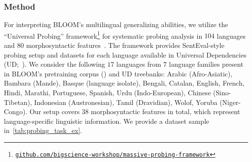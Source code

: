 \documentclass[twoside,11pt]{article}
\begin{document}
\subsubsection{Method}
\label{subsec:eval:probing}
For interpreting BLOOM's multilingual generalizing abilities, we utilize the ``Universal Probing'' framework\footnote{\href{https://github.com/bigscience-workshop/massive-probing-framework}{\texttt{github.com/bigscience-workshop/massive-probing-framework}}} for systematic probing analysis in $104$ languages and $80$ morphosyntactic features~\citep{serikov2022universal}. The framework provides SentEval-style~\citep{conneau-etal-2018-cram} probing setup and datasets for each language available in Universal Dependencies (UD;~\citealp{nivre-etal-2016-universal}). We consider the following $17$ languages from $7$ language families present in BLOOM's pretraining corpus () and UD treebanks: Arabic (Afro-Asiatic), Bambara (Mande), Basque (language isolate), Bengali, Catalan, English, French, Hindi, Marathi, Portuguese, Spanish, Urdu (Indo-European), Chinese (Sino-Tibetan), Indonesian (Austronesian), Tamil (Dravidian), Wolof, Yoruba (Niger-Congo). Our setup covers $38$ morphosyntactic features in total, which represent language-specific linguistic information. We provide a dataset sample in~\autoref{tab:probing_task_ex}.

\begin{table}[ht!]
    \centering
    \caption{Examples of the Number task in English and Spanish. The subject number indicator is highlighted in \textbf{bold}. The task is to predict if the sentence includes a singular subject number (upper sentence) and a plural subject number (bottom sentence).}
    \label{tab:probing_task_ex}
\end{table}
\end{document}
